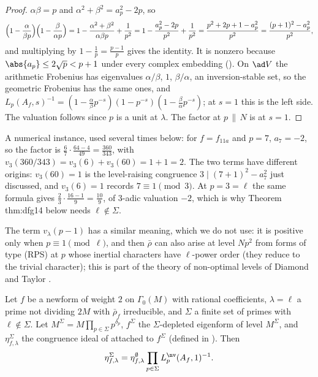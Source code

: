 \begin{proof}
$\alpha\beta=p$ and $\alpha^2+\beta^2=a_p^2-2p$, so
\[
\Bigl(1-\frac{\alpha}{\beta p}\Bigr)\Bigl(1-\frac{\beta}{\alpha p}\Bigr)=1-\frac{\alpha^2+\beta^2}{\alpha\beta p}+\frac1{p^2}=1-\frac{a_p^2-2p}{p^2}+\frac1{p^2}=\frac{p^2+2p+1-a_p^2}{p^2}=\frac{(p+1)^2-a_p^2}{p^2},
\]
and multiplying by $1-\frac1p=\frac{p-1}p$ gives the identity. It is nonzero because $\abs{a_p}\le2\sqrt p<p+1$ under every complex embedding (). On $\ad V$ the
arithmetic Frobenius has eigenvalues $\alpha/\beta$, $1$, $\beta/\alpha$, an inversion-stable set, so the geometric Frobenius has the same ones, and
$L_p(A_f,s)^{-1}=(1-\frac\alpha\beta p^{-s})(1-p^{-s})(1-\frac\beta\alpha p^{-s})$; at $s=1$ this is the left side. The valuation follows since $p$ is a unit at $\lambda$. The factor at $p\,\|\,N$ is
 at $s=1$.
\end{proof}

A numerical instance, used several times below: for $f=f_{11a}$ and $p=7$, $a_7=-2$, so the factor is $\frac67\cdot\frac{64-4}{49}=\frac{360}{343}$, with $v_3(360/343)=v_3(6)+v_3(60)=1+1=2$. The two
terms have different origins: $v_3(60)=1$ is the level-raising congruence $3\mid(7+1)^2-a_7^2$ just discussed, and $v_3(6)=1$ records $7\equiv1\pmod3$. At $p=3=\ell$ the same
formula gives $\frac23\cdot\frac{16-1}{9}=\frac{10}{9}$, of $3$-adic valuation $-2$, which is why Theorem thm:dfg14 below needs $\ell\notin\Sigma$.

The term $v_\lambda(p-1)$ has a similar meaning, which we do not use: it is positive only when $p\equiv1\pmod\ell$, and then $\bar\rho$ can also arise at level $Np^2$ from forms
of type (RPS) at $p$ whose inertial characters have $\ell$-power order (they reduce to the trivial character); this is part of the theory of non-optimal
levels of Diamond and Taylor \cite{DiamondTaylor94}.

\begin{theorem}\label{thm:modgalrep:dfg14}
Let $f$ be a newform of weight $2$ on $\Gamma_0(M)$ with rational coefficients, $\lambda=\ell$ a prime not dividing $2M$ with $\bar\rho_f$ irreducible, and $\Sigma$ a finite
set of primes with $\ell\notin\Sigma$. Let $M^\Sigma=M\prod_{p\in\Sigma}p^{\delta_p}$, $f^\Sigma$ the $\Sigma$-depleted eigenform of level $M^\Sigma$, and $\eta^\Sigma_{f,\lambda}$ the congruence ideal of
\cite{DFG04} attached to $f^\Sigma$ (defined in ). Then
\[
\eta^\Sigma_{f,\lambda}=\eta^\emptyset_{f,\lambda}\prod_{p\in\Sigma}L_p^{\nv}(A_f,1)^{-1}.
\]
\end{theorem}

